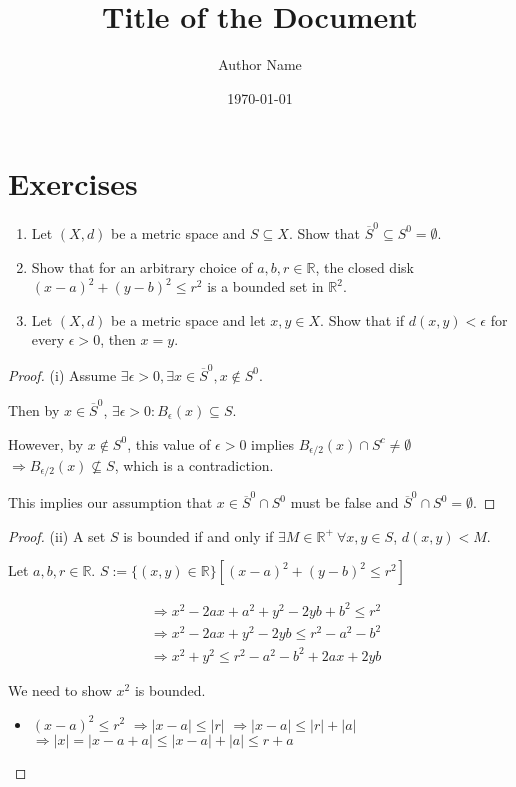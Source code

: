 \documentclass{article}
\title{\textbf{Title of the Document}}
\author{Author Name}
\date{\today}
\theoremstyle{definition}
\numberwithin{equation}{section}
\begin{document}
\maketitle
\tableofcontents
\newpage
\section{Exercises}
\begin{enumerate}
    \item Let $(X,d)$ be a metric space and $S \subseteq X$. Show that $\overline{S}^0 \subseteq S^0 = \emptyset$.
    \item Show that for an arbitrary choice of $a,b,r \in \mathbb{R}$, the closed disk $(x-a)^2 + (y-b)^2 \leq r^2$ is a bounded set in $\mathbb{R}^2$.
    \item Let $(X,d)$ be a metric space and let $x,y \in X$. Show that if $d(x,y) < \epsilon$ for every $\epsilon > 0$, then $x = y$.
\end{enumerate}

\begin{proof}
    (i) Assume $\exists \epsilon > 0, \exists x \in \overline{S}^0, x \not\in S^0$.

    Then by $x \in \overline{S}^0$, $\exists \epsilon > 0: B_\epsilon(x) \subseteq S$. 

    However, by $x \not\in S^0$, this value of $\epsilon > 0$ implies $B_{\epsilon / 2}(x) \cap S^c \neq \emptyset$ $\Rightarrow B_{\epsilon / 2}(x) \not\subseteq S$, which is a contradiction.

    This implies our assumption that $x \in \overline{S}^0 \cap S^0$ must be false and $\overline{S}^0 \cap S^0 = \emptyset$.
\end{proof}

\begin{proof}
    (ii) A set $S$ is bounded if and only if $\exists M \in \mathbb{R}^+ \ \forall x, y \in S$, $d(x,y) < M$. 

    Let $a, b, r \in \mathbb{R}$.
    $S := \{(x,y) \in \mathbb{R} \} [(x-a)^2 + (y-b)^2 \leq r^2]$

    \begin{align*}
        &\Rightarrow x^2 - 2ax + a^2 + y^2 - 2yb + b^2 \leq r^2 \\
        &\Rightarrow x^2 - 2ax + y^2 - 2yb \leq r^2 - a^2 - b^2 \\
        &\Rightarrow x^2 + y^2 \leq r^2 - a^2 - b^2 + 2ax + 2yb
    \end{align*}

    We need to show $x^2$ is bounded.
    \begin{itemize}
        \item $(x-a)^2 \leq r^2$ 
            $\Rightarrow |x - a| \leq |r|$
            $\Rightarrow |x-a| \leq |r| + |a|$
            $\Rightarrow |x| = |x-a + a| \leq |x-a| + |a| \leq r + a$
    \end{itemize}
\end{proof}
\end{document}
